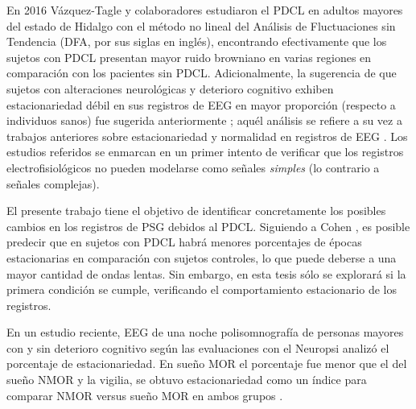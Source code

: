 En 2016 Vázquez-Tagle y colaboradores estudiaron el PDCL en adultos mayores del estado de Hidalgo con el método no lineal del Análisis de Fluctuaciones sin Tendencia (DFA, por sus siglas en inglés), encontrando efectivamente que los sujetos con PDCL presentan mayor ruido browniano en varias regiones en comparación con los pacientes sin PDCL\cite{VazquezTagle16}.
%
Adicionalmente, la sugerencia de que sujetos con alteraciones neurológicas y deterioro cognitivo exhiben estacionariedad débil en sus 
registros de EEG en mayor proporción (respecto a individuos sanos) fue sugerida anteriormente
\cite{Cohen77}; aquél análisis se 
refiere a su vez a trabajos anteriores sobre estacionariedad y normalidad en registros de EEG
\cite{McEwen75,Sugimoto78,Kawabata73}.
%
Los estudios referidos se enmarcan en un primer intento de verificar que los registros 
electrofisiológicos no pueden modelarse como señales \textit{simples} (lo contrario a señales 
complejas).
%

El presente trabajo tiene el objetivo de identificar concretamente
los posibles cambios en los registros de PSG  debidos al PDCL. Siguiendo a Cohen \cite{Cohen77}, es posible predecir que en sujetos con PDCL habrá menores porcentajes de épocas estacionarias en comparación con sujetos controles, lo que puede deberse a una mayor cantidad de ondas lentas. Sin embargo, en esta tesis sólo se explorará si la primera condición se cumple, verificando el comportamiento estacionario de los registros.%


En un estudio reciente, EEG de una noche polisomnografía de personas mayores con y sin deterioro cognitivo según las evaluaciones con el Neuropsi analizó el porcentaje de estacionariedad.  En sueño MOR el porcentaje fue menor que el del sueño NMOR y la vigilia, se obtuvo estacionariedad  como un índice para comparar NMOR versus sueño MOR en ambos grupos \cite{ROSALESLAGARDE2017}.

